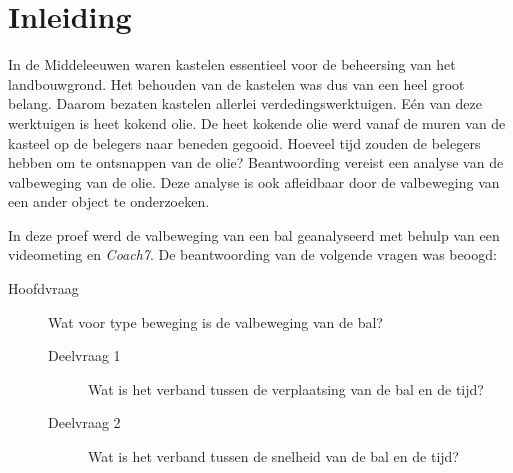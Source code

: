 \documentclass[•]{scrartcl}
\begin{document}

%
\tableofcontents
\newpage
\section*{Inleiding}
\label{sec:Inleiding} 
In de Middeleeuwen waren kastelen essentieel voor de beheersing van het landbouwgrond. Het behouden van de kastelen was dus van een heel groot belang. Daarom bezaten kastelen allerlei verdedingswerktuigen. E\'{e}n van deze werktuigen is heet kokend olie. De heet kokende olie werd vanaf de muren van de kasteel op de belegers naar beneden gegooid. Hoeveel tijd zouden de belegers hebben om te ontsnappen van de olie? Beantwoording vereist een analyse van de valbeweging van de olie. Deze analyse is ook afleidbaar door de valbeweging van een ander object te onderzoeken.
\par
In deze proef werd de valbeweging van een bal geanalyseerd met behulp van een videometing en \textit{Coach7}. De beantwoording van de volgende vragen was beoogd:
\begin{description}
\item[Hoofdvraag] Wat voor type beweging is de valbeweging van de bal?
\begin{description}
\item[Deelvraag 1] Wat is het verband tussen de verplaatsing van de bal en de tijd?
\item[Deelvraag 2] Wat is het verband tussen de snelheid van de bal en de tijd?
\end{description}
\end{description}
%
\end{document}
